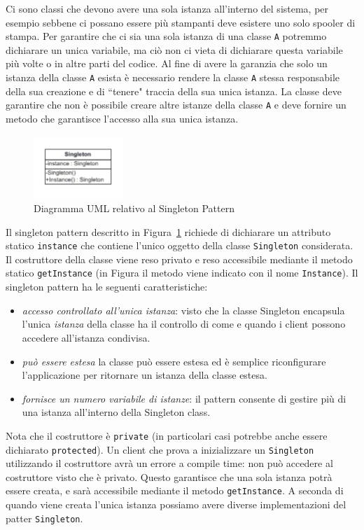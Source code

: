\documentclass{article}
\begin{document}
Ci sono classi che devono avere una sola istanza all'interno del sistema, per esempio sebbene ci possano essere pi\`u stampanti deve esistere uno solo spooler di stampa.
Per garantire che ci sia una sola istanza di una classe \texttt{A} potremmo dichiarare un unica variabile, ma ci\`o non ci vieta di dichiarare questa variabile pi\`u volte o in altre parti del codice.
Al fine di avere la garanzia che solo un istanza della classe \texttt{A} esista \`e necessario rendere la classe \texttt{A}  stessa  responsabile della sua creazione e di ``tenere" traccia della sua unica istanza. La classe deve garantire che non \`e possibile creare altre istanze della classe \texttt{A} e deve fornire un metodo che garantisce l'accesso alla sua unica istanza.

\begin{figure}[h]
\centering
\includegraphics[width=0.3\textwidth]{Img/Singleton.pdf}
\caption{Diagramma UML relativo al Singleton Pattern}
\label{Fig:Singleton}
\end{figure}

Il singleton pattern descritto in Figura~\ref{Fig:Singleton} richiede di dichiarare un attributo statico \texttt{instance} che contiene l'unico oggetto della classe \texttt{Singleton} considerata. Il costruttore della classe viene reso privato e reso accessibile mediante il metodo statico \texttt{getInstance} (in Figura il metodo viene indicato con il nome \texttt{Instance}).
Il singleton pattern ha le seguenti caratteristiche:
\begin{itemize}
\item \emph{accesso controllato all'unica istanza}: visto che la classe Singleton encapsula l'unica \emph{istanza} della classe ha il controllo di come e quando i client possono accedere all'istanza condivisa.
\item \emph{pu\`o essere estesa} la classe pu\`o essere estesa ed \`e semplice riconfigurare l'applicazione per ritornare un istanza della classe estesa. 
\item \emph{fornisce un numero variabile di istanze}: il pattern consente di gestire pi\`u di una istanza all'interno della Singleton class. 
\end{itemize}
Nota che il costruttore \`e \texttt{private} (in particolari casi potrebbe anche essere dichiarato \texttt{protected}). Un client che prova a inizializzare un \texttt{Singleton} utilizzando il costruttore avr\`a un errore a compile time: non pu\`o accedere al costruttore visto che \`e privato. Questo garantisce che una sola istanza potr\`a essere creata, e sar\`a accessibile mediante il metodo \texttt{getInstance}. A seconda di quando viene creata l'unica istanza possiamo avere diverse implementazioni del patter \texttt{Singleton}.
\end{document}
